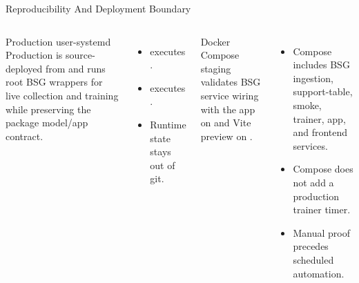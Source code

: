 \documentclass[aspectratio=169]{beamer}
\begin{document}
\begin{frame}[shrink=4]{Reproducibility And Deployment Boundary}
\begin{columns}[T,onlytextwidth]
\begin{block}{Production user-systemd}
\small Production is source-deployed from  and runs root BSG wrappers for live collection and training while preserving the package model/app contract.
\end{block}
\tightsep
\begin{itemize}
  \item {} executes .
  \item {} executes .
  \item Runtime state stays out of git.
\end{itemize}

\begin{block}{Docker Compose staging}
\small {} validates BSG service wiring with the app on  and Vite preview on .
\end{block}
\tightsep
\begin{itemize}
  \item Compose includes BSG ingestion, support-table, smoke, trainer, app, and frontend services.
  \item Compose does not add a production trainer timer.
  \item Manual proof precedes scheduled automation.
\end{itemize}
\end{columns}
\end{frame}
\end{document}
